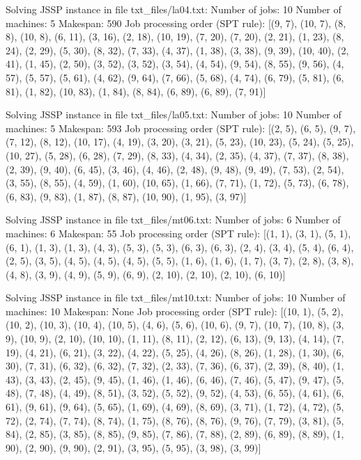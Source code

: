 \documentclass[paper=a4, fontsize=11pt]{scrartcl}
\numberwithin{equation}{section}		%
\numberwithin{figure}{section}			%
\numberwithin{table}{section}				%
\begin{document}
Solving JSSP instance in file txt\_files/la04.txt:
Number of jobs: 10
Number of machines: 5
Makespan: 590
Job processing order (SPT rule): [(9, 7), (10, 7), (8, 8), (10, 8), (6, 11), (3, 16), (2, 18), (10, 19), (7, 20), (7, 20), (2, 21), (1, 23), (8, 24), (2, 29), (5, 30), (8, 32), (7, 33), (4, 37), (1, 38), (3, 38), (9, 39), (10, 40), (2, 41), (1, 45), (2, 50), (3, 52), (3, 52), (3, 54), (4, 54), (9, 54), (8, 55), (9, 56), (4, 57), (5, 57), (5, 61), (4, 62), (9, 64), (7, 66), (5, 68), (4, 74), (6, 79), (5, 81), (6, 81), (1, 82), (10, 83), (1, 84), (8, 84), (6, 89), (6, 89), (7, 91)]

Solving JSSP instance in file txt\_files/la05.txt:
Number of jobs: 10
Number of machines: 5
Makespan: 593
Job processing order (SPT rule): [(2, 5), (6, 5), (9, 7), (7, 12), (8, 12), (10, 17), (4, 19), (3, 20), (3, 21), (5, 23), (10, 23), (5, 24), (5, 25), (10, 27), (5, 28), (6, 28), (7, 29), (8, 33), (4, 34), (2, 35), (4, 37), (7, 37), (8, 38), (2, 39), (9, 40), (6, 45), (3, 46), (4, 46), (2, 48), (9, 48), (9, 49), (7, 53), (2, 54), (3, 55), (8, 55), (4, 59), (1, 60), (10, 65), (1, 66), (7, 71), (1, 72), (5, 73), (6, 78), (6, 83), (9, 83), (1, 87), (8, 87), (10, 90), (1, 95), (3, 97)]

Solving JSSP instance in file txt\_files/mt06.txt:
Number of jobs: 6
Number of machines: 6
Makespan: 55
Job processing order (SPT rule): [(1, 1), (3, 1), (5, 1), (6, 1), (1, 3), (1, 3), (4, 3), (5, 3), (5, 3), (6, 3), (6, 3), (2, 4), (3, 4), (5, 4), (6, 4), (2, 5), (3, 5), (4, 5), (4, 5), (4, 5), (5, 5), (1, 6), (1, 6), (1, 7), (3, 7), (2, 8), (3, 8), (4, 8), (3, 9), (4, 9), (5, 9), (6, 9), (2, 10), (2, 10), (2, 10), (6, 10)]

Solving JSSP instance in file txt\_files/mt10.txt:
Number of jobs: 10
Number of machines: 10
Makespan: None
Job processing order (SPT rule): [(10, 1), (5, 2), (10, 2), (10, 3), (10, 4), (10, 5), (4, 6), (5, 6), (10, 6), (9, 7), (10, 7), (10, 8), (3, 9), (10, 9), (2, 10), (10, 10), (1, 11), (8, 11), (2, 12), (6, 13), (9, 13), (4, 14), (7, 19), (4, 21), (6, 21), (3, 22), (4, 22), (5, 25), (4, 26), (8, 26), (1, 28), (1, 30), (6, 30), (7, 31), (6, 32), (6, 32), (7, 32), (2, 33), (7, 36), (6, 37), (2, 39), (8, 40), (1, 43), (3, 43), (2, 45), (9, 45), (1, 46), (1, 46), (6, 46), (7, 46), (5, 47), (9, 47), (5, 48), (7, 48), (4, 49), (8, 51), (3, 52), (5, 52), (9, 52), (4, 53), (6, 55), (4, 61), (6, 61), (9, 61), (9, 64), (5, 65), (1, 69), (4, 69), (8, 69), (3, 71), (1, 72), (4, 72), (5, 72), (2, 74), (7, 74), (8, 74), (1, 75), (8, 76), (8, 76), (9, 76), (7, 79), (3, 81), (5, 84), (2, 85), (3, 85), (8, 85), (9, 85), (7, 86), (7, 88), (2, 89), (6, 89), (8, 89), (1, 90), (2, 90), (9, 90), (2, 91), (3, 95), (5, 95), (3, 98), (3, 99)]
\end{document}
